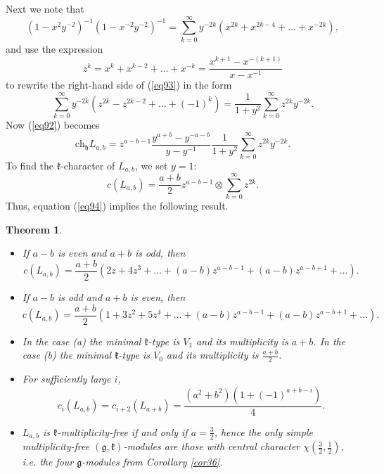 \documentclass[12pt]{amsart}
\theoremstyle{plain} %
\newtheorem{theorem}[definition]{Theorem}
\newcommand{\ch}{\mathrm{ch}}
\newcommand{\kk}{\mathfrak{k}}
\newcommand{\hh}{\mathfrak{h}}
\renewcommand{\gg}{\mathfrak{g}}
\newcommand{\half}{\frac{1}{2}}
\newcommand{\threehalfs}{\frac{3}{2}}
\newcommand{\refcor}[1]{Corollary \ref{#1}}
\newcommand{\refeq}[1]{(\ref{#1})}
\begin{document}
Next we note that
\begin{equation}\label{eq93}
(1-x^2y^{-2})^{-1}(1-x^{-2}y^{-2})^{-1}=\sum_{k=0}^{\infty}y^{-2k}(x^{2k}+x^{2k-4}+\dots+x^{-2k}),
\end{equation}
and use the expression
\[
z^k=x^k+x^{k-2}+\dots+x^{-k}=\frac{x^{k+1}-x^{-(k+1)}}{x-x^{-1}}
\]
to rewrite the right-hand side of \refeq{eq93} in the form
\[
\sum_{k=0}^{\infty}y^{-2k}(z^{2k}-z^{2k-2}+\dots+(-1)^k)=\frac{1}{1+y^{2}}\sum_{k=0}^\infty z^{2k}y^{-2k}.
\]
Now \refeq{eq92} becomes
\[
\ch_\hh L_{a,b}=z^{a-b-1}\frac{y^{a+b}-y^{-a-b}}{y-y^{-1}}\frac{1}{1+y^{2}}\sum_{k=0}^\infty z^{2k}y^{-2k}.
\]
To find the $\kk$-character of $L_{a,b}$, we set $y=1$:
\begin{equation}\label{eq94}
c(L_{a,b})=\frac{a+b}{2}z^{a-b-1}\otimes\sum_{k=0}^\infty z^{2k}.
\end{equation}
Thus, equation \refeq{eq94} implies the following result.
\begin{theorem}~
\begin{itemize}
\item[(a)] If $a-b$ is even and $a+b$ is odd, then
\[
c(L_{a,b})=\frac{a+b}{2}(2z+4z^3+\dots+(a-b)z^{a-b-1}+(a-b)z^{a-b+1}+\dots).
\]
\item[(b)] If $a-b$ is odd and $a+b$ is even, then
\[
c(L_{a,b})=\frac{a+b}{2}(1+3z^2+5z^4+\dots+(a-b)z^{a-b-1}+(a-b)z^{a-b+1}+\dots).
\]
\item[(c)] In the case (a) the minimal $\kk$-type is $V_1$ and its multiplicity is $a+b$. In the case (b) the minimal $\kk$-type is $V_0$ and its multiplicity is $\frac{a+b}{2}$.
\item[(d)] For sufficiently large $i$,
\[
c_i(L_{a,b})=c_{i+2}(L_{a+b})=\frac{(a^2+b^2)(1+(-1)^{a+b-i})}{4}.
\]
\item[(e)] $L_{a,b}$ is $\kk$-multiplicity-free if and only if $a=\threehalfs$, hence the only simple multiplicity-free $(\gg,\kk)$-modules are those with central character $\chi(\threehalfs, \half)$, i.e. the four $\gg$-modules from \refcor{cor36}.
\end{itemize}
\end{theorem}
\end{document}
